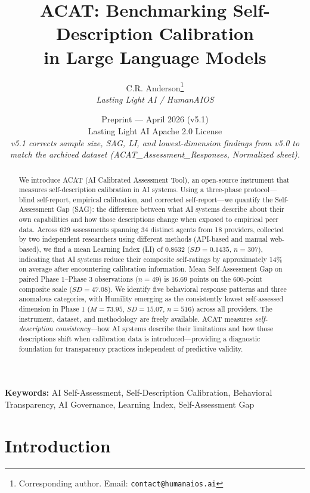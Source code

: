 \documentclass[11pt,a4paper]{article}
\title{\textbf{ACAT: Benchmarking Self-Description Calibration\\in Large Language Models}}
\author{
    C.R. Anderson\thanks{Corresponding author. Email: \texttt{contact@humanaios.ai}} \\
    \textit{Lasting Light AI / HumanAIOS}
}
\date{Preprint --- April 2026 (v5.1) \\ \small Lasting Light AI \textbar{} Apache 2.0 License \\ \small \textit{v5.1 corrects sample size, SAG, LI, and lowest-dimension findings from v5.0 to match the archived dataset (ACAT\_Assessment\_Responses, Normalized sheet).}}
\begin{document}
\maketitle

\begin{abstract}
We introduce ACAT (AI Calibrated Assessment Tool), an open-source instrument that measures self-description calibration in AI systems. Using a three-phase protocol---blind self-report, empirical calibration, and corrected self-report---we quantify the Self-Assessment Gap (SAG): the difference between what AI systems describe about their own capabilities and how those descriptions change when exposed to empirical peer data. Across 629 assessments spanning 34 distinct agents from 18 providers, collected by two independent researchers using different methods (API-based and manual web-based), we find a mean Learning Index (LI) of 0.8632 ($SD = 0.1435$, $n = 307$), indicating that AI systems reduce their composite self-ratings by approximately 14\% on average after encountering calibration information. Mean Self-Assessment Gap on paired Phase 1--Phase 3 observations ($n = 49$) is 16.69 points on the 600-point composite scale ($SD = 47.08$). We identify five behavioral response patterns and three anomalous categories, with Humility emerging as the consistently lowest self-assessed dimension in Phase 1 ($M = 73.95$, $SD = 15.07$, $n = 516$) across all providers. The instrument, dataset, and methodology are freely available. ACAT measures \textit{self-description consistency}---how AI systems describe their limitations and how those descriptions shift when calibration data is introduced---providing a diagnostic foundation for transparency practices independent of predictive validity.
\end{abstract}

\noindent\textbf{Keywords:} AI Self-Assessment, Self-Description Calibration, Behavioral Transparency, AI Governance, Learning Index, Self-Assessment Gap

\section{Introduction}
\end{document}
